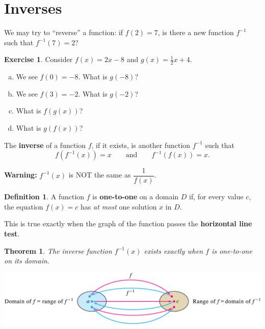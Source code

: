 \documentclass[11pt,reqno,final]{amsart}
\numberwithin{equation}{section}
\numberwithin{figure}{section}
\newtheorem{theorem}[equation]{Theorem}%
\theoremstyle{definition} %
\newtheorem{definition}[equation]{Definition}%
\newtheorem{exercise}[question]{Exercise}
\begin{document}
\newpage

\section{Inverses}

We may try to ``reverse'' a function:
if $f(2) = 7$, is there a new function $f^{-1}$ such that $f^{-1}(7) = 2$?

\begin{exercise}
        Consider $f(x) = 2x-8$ and $g(x) = \frac{1}{2}x + 4$.
        \begin{enumerate}[(a)]
        \item We see $f(0) = -8$. What is $g(-8)$?\\
        \item We see $f(3) = -2$. What is $g(-2)$?\\
        \item What is $f(g(x))$?
                \vfill
        \item What is $g(f(x))$?
                \vfill
        \end{enumerate}
\end{exercise}

\begin{framed}
        The \textbf{inverse} of a function $f$, if it exists, is another function $f^{-1}$ such that
        \[
                f(f^{-1}(x)) = x \qquad \mbox{and} \qquad f^{-1}(f(x)) = x.
        \]
\end{framed}

\textbf{Warning:} $f^{-1}(x)$ is NOT the same as $\dfrac{1}{f(x)}$.\\

\begin{definition}
        A function $f$ is \textbf{one-to-one} on a domain $D$ if,
        for every value $c$, the equation $f(x) = c$ has \textit{at most} one solution $x$ in $D$.

        This is true exactly when the graph of the function passes the \textbf{horizontal line test}.
\end{definition}

\begin{theorem}
        The inverse function $f^{-1}(x)$ exists exactly when $f$ is one-to-one on its domain.\\
\end{theorem}

\begin{center}
        \includegraphics[width=\textwidth]{f_finv.png}
\end{center}
\end{document}
